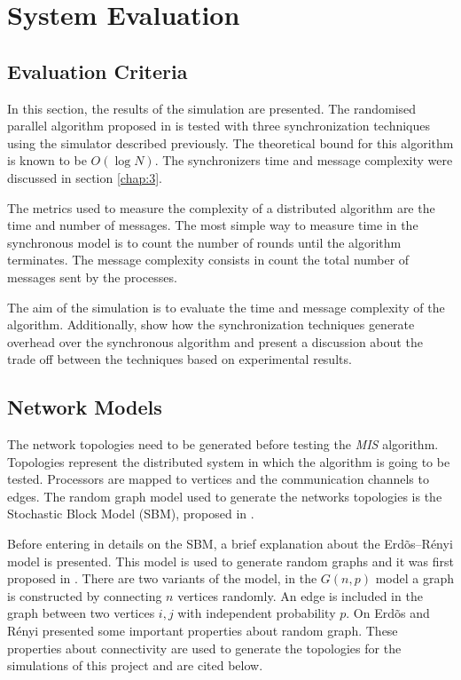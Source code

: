\section{System Evaluation}
\label{chap:5}
\subsection{Evaluation Criteria}

In this section, the results of the simulation are presented. The randomised parallel algorithm proposed in \cite{yves2009optimal} is tested with three synchronization techniques using the simulator described previously. The theoretical bound for this algorithm is known to be $O(\log N)$. The synchronizers time and message complexity were discussed in section \ref{chap:3}. 

The metrics used to measure the complexity of a distributed algorithm are the time and number of messages. The most simple way to measure time in the synchronous model is to count the number of rounds until the algorithm terminates. The message complexity consists in count the total number of messages sent by the processes.

 The aim of the simulation is to evaluate the time and message complexity of the algorithm. Additionally, show how the synchronization techniques generate overhead over the synchronous algorithm and present a discussion about the trade off between the techniques based on experimental results.


\subsection{Network Models}
\label{sec:topology}


The network topologies need to be generated before testing the \textit{MIS} algorithm. Topologies represent the distributed system in which the algorithm is going to be tested. Processors are mapped to vertices and the communication channels to edges.  The random graph model used to generate the networks topologies is the Stochastic Block Model (SBM), proposed in \cite{holland1983stochastic}.

Before entering in details on the SBM, a brief explanation about the Erd\~os--R\'enyi model is presented. This model is used to generate random graphs and it was first proposed in \cite{erdds1959random}. There are two variants of the model, in the $G(n, p)$ model a graph is constructed by connecting $n$ vertices randomly. An edge is included in the graph between two vertices $i,j$ with independent probability $p$. On \cite{erdos1960evolution} Erd\~os and R\'enyi presented some important properties about random graph. These properties about connectivity are used to generate the topologies for the simulations of this project and are cited below.



